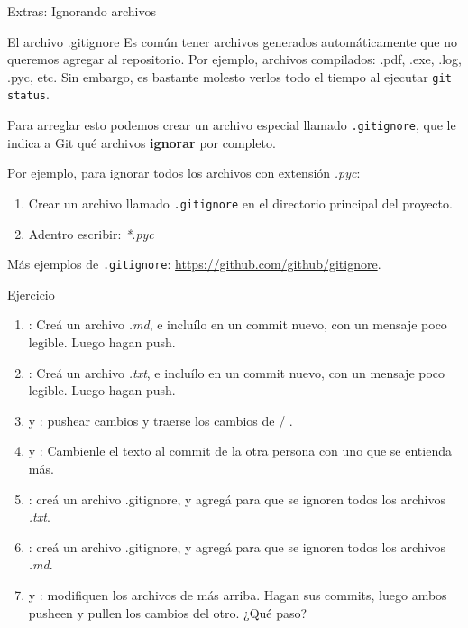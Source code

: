 \begin{frame}[t]{Extras: Ignorando archivos}

    \begin{block}{El archivo .gitignore}
      Es común tener archivos generados automáticamente que no queremos agregar al repositorio. Por ejemplo, archivos compilados: .pdf, .exe, .log, .pyc, etc. Sin embargo, es bastante molesto verlos todo el tiempo al ejecutar \texttt{git status}.

      Para arreglar esto podemos crear un archivo especial llamado \texttt{.gitignore}, que le indica a Git qué archivos \textbf{ignorar} por completo.
    \end{block}

    \pause
    \begin{resumen}{}
      Por ejemplo, para ignorar todos los archivos con extensión \textit{.pyc}:
      \begin{enumerate}
        \item Crear un archivo llamado \texttt{.gitignore} en el directorio principal del proyecto.
        \item Adentro escribir: \textit{*.pyc}
      \end{enumerate}
      Más ejemplos de \texttt{.gitignore}: \url{https://github.com/github/gitignore}.
    \end{resumen}

\end{frame}

\begin{frame}[t]{Ejercicio}
    \begin{ejercicio}{}
\begin{enumerate}
    \item {}: Creá un archivo \textit{.md}, e incluílo en un commit nuevo, con un mensaje poco legible. Luego hagan push.
    \item {}: Creá un archivo \textit{.txt}, e incluílo en un commit nuevo, con un mensaje poco legible. Luego hagan push.
    \item {} y : pushear cambios y traerse los cambios de  / .
    \item {} y : Cambienle el texto al commit de la otra persona con uno que se entienda más.
    \pause
\item {}: creá un archivo .gitignore, y agregá para que se ignoren todos los archivos \textit{.txt}. 
\item {}: creá un archivo .gitignore, y agregá para que se ignoren todos los archivos \textit{.md}. 
\item {} y : modifiquen los archivos de más arriba. Hagan sus commits, luego ambos pusheen y pullen los cambios del otro.
    ¿Qué paso?
\end{enumerate}
\end{ejercicio}
\end{frame}

